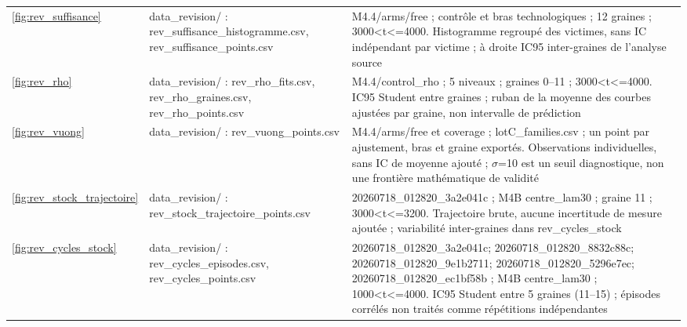 {\begin{longtable}{@{}p{.12\linewidth}p{.37\linewidth}p{.45\linewidth}@{}}
\ref{fig:rev_suffisance} & data\_\allowbreak{}revision/\allowbreak{} : rev\_\allowbreak{}suffisance\_\allowbreak{}histogramme.csv,\allowbreak{}  rev\_\allowbreak{}suffisance\_\allowbreak{}points.csv & M4.4/\allowbreak{}arms/\allowbreak{}free ; contrôle et bras technologiques ; 12 graines ; 3000<t<=4000. Histogramme regroupé des victimes,\allowbreak{}  sans IC indépendant par victime ; à droite IC95 inter-graines de l'analyse source \\
\ref{fig:rev_rho} & data\_\allowbreak{}revision/\allowbreak{} : rev\_\allowbreak{}rho\_\allowbreak{}fits.csv,\allowbreak{}  rev\_\allowbreak{}rho\_\allowbreak{}graines.csv,\allowbreak{}  rev\_\allowbreak{}rho\_\allowbreak{}points.csv & M4.4/\allowbreak{}control\_\allowbreak{}rho ; 5 niveaux ; graines 0--11 ; 3000<t<=4000. IC95 Student entre graines ; ruban de la moyenne des courbes ajustées par graine,\allowbreak{}  non intervalle de prédiction \\
\ref{fig:rev_vuong} & data\_\allowbreak{}revision/\allowbreak{} : rev\_\allowbreak{}vuong\_\allowbreak{}points.csv & M4.4/\allowbreak{}arms/\allowbreak{}free et coverage ; lotC\_\allowbreak{}families.csv ; un point par ajustement,\allowbreak{}  bras et graine exportés. Observations individuelles,\allowbreak{}  sans IC de moyenne ajouté ; $\sigma$=10 est un seuil diagnostique,\allowbreak{}  non une frontière mathématique de validité \\
\ref{fig:rev_stock_trajectoire} & data\_\allowbreak{}revision/\allowbreak{} : rev\_\allowbreak{}stock\_\allowbreak{}trajectoire\_\allowbreak{}points.csv & 20260718\_\allowbreak{}012820\_\allowbreak{}3a2e041c ; M4B centre\_\allowbreak{}lam30 ; graine 11 ; 3000<t<=3200. Trajectoire brute,\allowbreak{}  aucune incertitude de mesure ajoutée ; variabilité inter-graines dans rev\_\allowbreak{}cycles\_\allowbreak{}stock \\
\ref{fig:rev_cycles_stock} & data\_\allowbreak{}revision/\allowbreak{} : rev\_\allowbreak{}cycles\_\allowbreak{}episodes.csv,\allowbreak{}  rev\_\allowbreak{}cycles\_\allowbreak{}points.csv & 20260718\_\allowbreak{}012820\_\allowbreak{}3a2e041c; 20260718\_\allowbreak{}012820\_\allowbreak{}8832c88c; 20260718\_\allowbreak{}012820\_\allowbreak{}9e1b2711; 20260718\_\allowbreak{}012820\_\allowbreak{}5296e7ec; 20260718\_\allowbreak{}012820\_\allowbreak{}ec1bf58b ; M4B centre\_\allowbreak{}lam30 ; 1000<t<=4000. IC95 Student entre 5 graines (11--15) ; épisodes corrélés non traités comme répétitions indépendantes \\
\bottomrule\end{longtable}}
